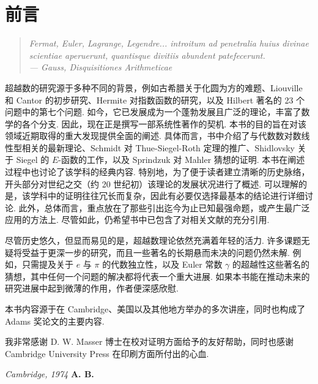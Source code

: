 
\chapter*{前言}

\begin{quote}
\centering\itshape
Fermat, Euler, Lagrange, Legendre... introitum ad penetralia huius divinae scientiae aperuerunt, quantisque divitiis abundent patefecerunt. \\
\hfill --- Gauss, \textit{Disquisitiones Arithmeticae}
\end{quote}

\vspace{1em}

超越数的研究源于多种不同的背景，例如古希腊关于化圆为方的难题、Liouville 和 Cantor 的初步研究、Hermite 对指数函数的研究，以及 Hilbert 著名的 23 个问题中的第七个问题. 如今，它已发展成为一个蓬勃发展且广泛的理论，丰富了数学的各个分支. 因此，现在正是撰写一部系统性著作的契机. 本书的目的旨在对该领域近期取得的重大发现提供全面的阐述. 具体而言，书中介绍了与代数数对数线性型相关的最新理论、Schmidt 对 Thue-Siegel-Roth 定理的推广、Shidlovsky 关于 Siegel 的 $E$-函数的工作，以及 Sprindzuk 对 Mahler 猜想的证明. 本书在阐述过程中也讨论了该学科的经典内容. 特别地，为了便于读者建立清晰的历史脉络，开头部分对世纪之交（约 20 世纪初）该理论的发展状况进行了概述. 可以理解的是，该学科中的证明往往冗长而复杂，因此有必要仅选择最基本的结论进行详细讨论. 此外，总体而言，重点放在了那些引出迄今为止已知最强命题，或产生最广泛应用的方法上. 尽管如此，仍希望书中已包含了对相关文献的充分引用.

尽管历史悠久，但显而易见的是，超越数理论依然充满着年轻的活力. 许多课题无疑将受益于更深一步的研究，而且一些著名的长期悬而未决的问题仍然未解. 例如，只需提及关于 $e$ 与 $\pi$ 的代数独立性，以及 Euler 常数 $\gamma$ 的超越性这些著名的猜想，其中任何一个问题的解决都将代表一个重大进展. 如果本书能在推动未来的研究进展中起到微薄的作用，作者便深感欣慰.

本书内容源于在 Cambridge、美国以及其他地方举办的多次讲座，同时也构成了 Adams 奖论文的主要内容.

我非常感谢 D. W. Masser 博士在校对证明方面给予的友好帮助，同时也感谢 Cambridge University Press 在印刷方面所付出的心血.

\vspace{1em}

\noindent
\textit{Cambridge, 1974} \hfill \textbf{A. B.}
